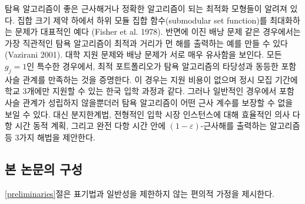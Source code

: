 \documentclass[11pt]{article} %
\newif\ifen
\theoremstyle{definition}
\theoremstyle{definition}
\begin{document}
\ifen
For certain classes of optimization problems, such as maximizing a submodular set function over a cardinality constraint, a greedy algorithm is known to be a good approximate solution and exact under certain additional assumptions (Fisher et al. 1978). For other problems, notably the binary knapsack problem, the most intuitive greedy algorithm can be made to perform arbitrarily poorly (Vazirani 2001). We show results for the college application problem that mirror those for knapsack: In the special case where each $g_j = 1$, the optimal portfolio satisfy a nestedness property that is equivalent to the validity of the greedy algorithm. This case mirrors the centralized college application process in Korea, where there is no application fee, but students are allowed to apply to only three schools during the main admissions cycle. Unfortunately, the nestedness property does not hold in the general case, nor does the greedy algorithm offers any performance guarantee. Instead, we offer a branch-and-bound routine, a pseudopolynomial-time algorithm that is tractable for typical college market instances, and an approximation scheme that produces a $(1 - \varepsilon)$-optimal solution in fully polynomial time.
\else
탐욕 알고리즘이 좋은 근사해거나 정확한 알고리즘이 되는 최적화 모형들이 알려져 있다. 집합 크기 제약 하에서 하위 모듈 집합 함수(submodular set function)를 최대화하는 문제가 대표적인 예다 (Fisher et al. 1978). 반면에 이진 배낭 문제 같은 경우에서는 가장 직관적인 탐욕 알고리즘이 최적과 거리가 먼 해를 출력하는 예를 만들 수 있다 (Vazirani 2001). 대학 지원 문제와 배낭 문제가 서로 매우 유사함을 보인다. 모든 $g_j=1$인 특수한 경우에서, 최적 포트폴리오가 탐욕 알고리즘의 타당성과 동등한 포함 사슬 관계를 만족하는 것을 증명한다. 이 경우는 지원 비용이 없으며 정시 모집 기간에 학교 3개에만 지원할 수 있는 한국 입학 과정과 같다. 그러나 일반적인 경우에서 포함 사슬 관계가 성립하지 않을뿐더러 탐욕 알고리즘이 어떤 근사 계수를 보장할 수 없을 보일 수 있다. 대신 분지한계법, 전형적인 입학 시장 인스턴스에 대해 효율적인 의사 다항 시간 동적 계획, 그리고 완전 다항 시간 안에 $(1 - \varepsilon)$-근사해를 출력하는 알고리즘 등 3가지 해법을 제안한다. 
\fi


\ifen \subsection{Structure of this paper} \else \subsection{본 논문의 구성}\fi
\ifen Section \ref{preliminaries} introduces some additional notation and assumptions that can be imposed with trivial loss of generality. 
\else \ref{preliminaries}절은 표기법과 일반성을 제한하지 않는 편의적 가정을 제시한다.\fi
\end{document}

